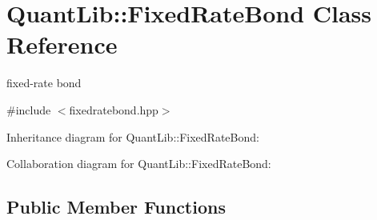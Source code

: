\section{Quant\+Lib\+:\+:Fixed\+Rate\+Bond Class Reference}
\label{class_quant_lib_1_1_fixed_rate_bond}


fixed-\/rate bond  




{\ttfamily \#include $<$fixedratebond.\+hpp$>$}



Inheritance diagram for Quant\+Lib\+:\+:Fixed\+Rate\+Bond\+:


Collaboration diagram for Quant\+Lib\+:\+:Fixed\+Rate\+Bond\+:
\subsection*{Public Member Functions}
